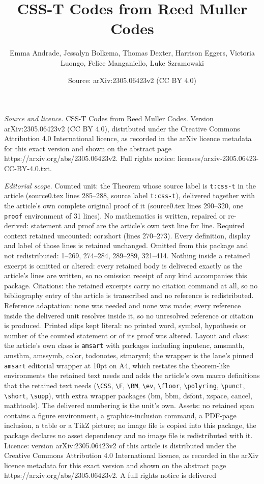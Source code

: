 \documentclass[10pt,a4paper]{amsart}
\title[CSS-T Codes from Reed Muller Codes]{CSS-T Codes from Reed Muller Codes}
\author{Emma Andrade, Jessalyn Bolkema, Thomas Dexter, Harrison Eggers, Victoria Luongo, Felice Manganiello, Luke Szramowski}
\date{Source: arXiv:2305.06423v2 (CC BY 4.0)}
\begin{document}
\maketitle

\noindent\emph{Source and licence.} CSS-T Codes from Reed Muller Codes. Version arXiv:2305.06423v2 (CC BY 4.0), distributed under the Creative Commons Attribution 4.0 International licence, as recorded in the arXiv licence metadata for this exact version and shown on the abstract page https://arxiv.org/abs/2305.06423v2. Full rights notice: licenses/arxiv-2305.06423-CC-BY-4.0.txt.\par\smallskip

\noindent\textit{Editorial scope.} Counted unit: the Theorem whose source label is \texttt{t:css-t} in the article (source0.tex lines 285--288, source label \texttt{t:css-t}), delivered together with the article's own complete original proof of it (source0.tex lines 290--320, one \texttt{proof} environment of 31 lines). No mathematics is written, repaired or re-derived: statement and proof are the article's own text line for line. Required context retained uncounted: cor:short (lines 270--273). Every definition, display and label of those lines is retained unchanged. Omitted from this package and not redistributed: 1--269, 274--284, 289--289, 321--414. Nothing inside a retained excerpt is omitted or altered: every retained body is delivered exactly as the article's lines are written, so no omission receipt of any kind accompanies this package. Citations: the retained excerpts carry no citation command at all, so no bibliography entry of the article is transcribed and no reference is redistributed. Reference adaptation: none was needed and none was made; every reference inside the delivered unit resolves inside it, so no unresolved reference or citation is produced. Printed slips kept literal: no printed word, symbol, hypothesis or number of the counted statement or of its proof was altered. Layout and class: the article's own class is \texttt{amsart} with packages including inputenc, amsmath, amsthm, amssymb, color, todonotes, stmaryrd; the wrapper is the lane's pinned \texttt{amsart} editorial wrapper at 10pt on A4, which restates the theorem-like environments the retained text needs and adds the article's own macro definitions that the retained text needs (\texttt{\textbackslash CSS}, \texttt{\textbackslash F}, \texttt{\textbackslash RM}, \texttt{\textbackslash ev}, \texttt{\textbackslash floor}, \texttt{\textbackslash polyring}, \texttt{\textbackslash punct}, \texttt{\textbackslash short}, \texttt{\textbackslash supp}), with extra wrapper packages (bm, bbm, dsfont, xspace, cancel, mathtools). The delivered numbering is the unit's own. Assets: no retained span contains a figure environment, a graphics-inclusion command, a PDF-page inclusion, a table or a TikZ picture; no image file is copied into this package, the package declares no asset dependency and no image file is redistributed with it. Licence: version arXiv:2305.06423v2 of this article is distributed under the Creative Commons Attribution 4.0 International licence, as recorded in the arXiv licence metadata for this exact version and shown on the abstract page https://arxiv.org/abs/2305.06423v2. A full rights notice is delivered 
\end{document}
